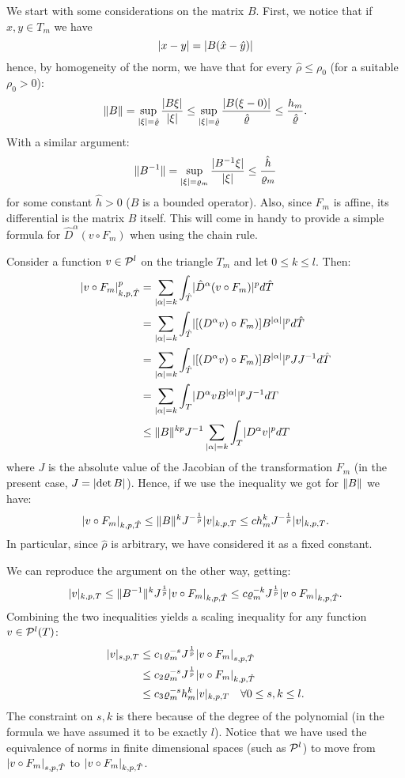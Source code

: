 We start with some considerations on the matrix $B$. First, we notice that if $x,y \in T_m$ we have
\[
\abs{x-y} = \abs{B(\hat{x}-\hat{y})}
\]
hence, by homogeneity of the norm, we have that for every $\hat{\rho} \le \rho_0$ (for a suitable $\rho_0>0$):
\[
\norm{B} = \sup_{\abs{\xi} = \hat{\rho}} \frac{\abs{B \xi}}{\abs{\xi}} \le
\sup_{\abs{\xi} = \hat{\rho}} \frac{\abs{B (\xi - 0)}}{\hat{\rho}} \le \frac{h_m}{\hat{\rho}}.
\]
With a similar argument:
\[
\norm{B^{-1}} = \sup_{\abs{\xi} = \rho_m} \frac{\abs{B^{-1} \xi}}{\abs{\xi}} \le \frac{\hat{h}}{\rho_m}
\]
for some constant $\hat{h} > 0$ ($B$ is a bounded operator).
Also, since $F_m$ is affine, its differential is the matrix $B$ itself. This will come in handy to provide a simple formula for $\hat{D}^\alpha (v \circ F_m)$ when using the chain rule.

Consider a function $v \in \P^l$ on the triangle $T_m$ and let $0\le k \le l$. Then:
\begin{align}
\abs{v \circ F_m}^p_{k,p,\hat{T}} 
&= \sum_{\abs{\alpha} = k} \int_{\hat{T}} \abs{ \hat{D}^\alpha (v \circ F_m)}^p d\hat{T} \\
&= \sum_{\abs{\alpha} = k} \int_{\hat{T}} \abs{ [(D^\alpha v) \circ F_m)] B^{\abs{\alpha}}}^p d\hat{T} \\
&= \sum_{\abs{\alpha} = k} \int_{\hat{T}} \abs{ [(D^\alpha v) \circ F_m)] B^{\abs{\alpha}}}^p J J^{-1} d\hat{T} \\
&= \sum_{\abs{\alpha} = k} \int_{T} \abs{ D^\alpha v B^{\abs{\alpha}}}^p J^{-1} dT \\
&\le \norm{B}^{kp} J^{-1} \sum_{\abs{\alpha} = k} \int_{T} \abs{ D^\alpha v}^p dT
\end{align}
where $J$ is the absolute value of the Jacobian of the transformation $F_m$ (in the present case, $J=\abs{\det B}$). Hence, if we use the inequality we got for $\norm{B}$ we have:
\[
\abs{v \circ F_m}_{k,p,\hat{T}} \le \norm{B}^k J^{-\frac{1}{p}} \abs{v}_{k,p,T}
\le c h_m^k J^{-\frac{1}{p}} \abs{v}_{k,p,T}.
\]
In particular, since $\hat{\rho}$ is arbitrary, we have considered it as a fixed constant.

We can reproduce the argument on the other way, getting:
\[
\abs{v}_{k,p,T} \le \norm{B^{-1}}^k J^{\frac{1}{p}} \abs{v \circ F_m}_{k,p,\hat{T}}
\le c \rho_m^{-k} J^{\frac{1}{p}} \abs{v \circ F_m}_{k,p,\hat{T}}.
\]
Combining the two inequalities yields a scaling inequality for any function $v \in \P^l(T)$:
\begin{align}
\abs{v}_{s,p,T} &\le c_1 \rho_m^{-s} J^{\frac{1}{p}} \abs{v \circ F_m}_{s,p,\hat{T}} \\
& \le c_2 \rho_m^{-s} J^{\frac{1}{p}} \abs{v \circ F_m}_{k,p,\hat{T}} \\
& \le c_3 \rho_m^{-s} h_m^k \abs{v}_{k,p,T} \quad \forall 0\le s,k \le l.
\end{align}
The constraint on $s,k$ is there because of the degree of the polynomial (in the formula we have assumed it to be exactly $l$). Notice that we have used the equivalence of norms in finite dimensional spaces (such as $\P^l$) to move from $\abs{v \circ F_m}_{s,p,\hat{T}}$ to $\abs{v \circ F_m}_{k,p,\hat{T}}$.

